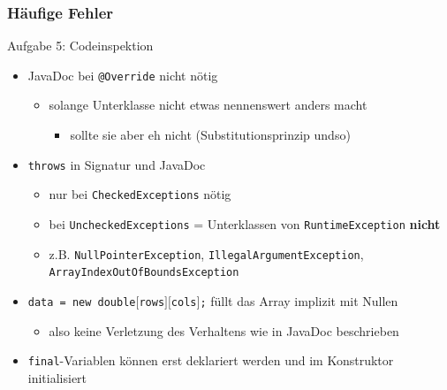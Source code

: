 \documentclass[18pt]{beamer}
\begin{document}
	\begin{frame}
		\frametitle{Häufige Fehler}
		\begin{block}{Aufgabe 5: Codeinspektion}
			\begin{itemize} \pause
				\item JavaDoc bei \texttt{@Override} nicht nötig
				\begin{itemize}
					\item solange Unterklasse nicht etwas nennenswert anders macht
					\begin{itemize}
						\item sollte sie aber eh nicht (Substitutionsprinzip undso)
					\end{itemize}
				\end{itemize}
				\pause
				\item \texttt{throws} in Signatur und JavaDoc
				\begin{itemize}
					\item nur bei \texttt{CheckedExceptions} nötig
					\item bei \texttt{UncheckedExceptions} = Unterklassen von \texttt{RuntimeException} \textbf{nicht}
					\item z.B. \texttt{NullPointerException}, \texttt{IllegalArgumentException}, \texttt{ArrayIndexOutOfBoundsException}
				\end{itemize}
				\pause
				\item \texttt{data = new double$\lbrack$rows$\rbrack\lbrack$cols$\rbrack$;} füllt das Array implizit mit Nullen
				\begin{itemize}
					\item also keine Verletzung des Verhaltens wie in JavaDoc beschrieben
				\end{itemize} \pause
				\item \texttt{final}-Variablen können erst deklariert werden und im Konstruktor initialisiert
			\end{itemize}
		\end{block}
	\end{frame}
		
\end{document}
